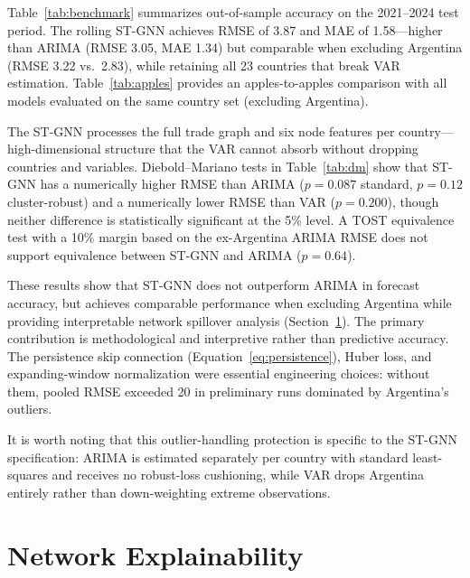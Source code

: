 \documentclass[12pt,a4paper]{article}
\begin{document}
Table~\ref{tab:benchmark} summarizes out-of-sample accuracy on the 2021--2024 test period.
The rolling ST-GNN achieves RMSE of 3.87 and MAE of 1.58---higher than ARIMA (RMSE 3.05, MAE 1.34) but comparable when excluding Argentina (RMSE 3.22 vs.\ 2.83), while retaining all 23 countries that break VAR estimation.
Table~\ref{tab:apples} provides an apples-to-apples comparison with all models evaluated on the same country set (excluding Argentina).





The ST-GNN processes the full trade graph and six node features per country---high-dimensional structure that the VAR cannot absorb without dropping countries and variables.
Diebold--Mariano tests in Table~\ref{tab:dm} show that ST-GNN has a numerically higher RMSE than ARIMA ($p=0.087$ standard, $p=0.12$ cluster-robust) and a numerically lower RMSE than VAR ($p=0.200$), though neither difference is statistically significant at the 5\% level.
A TOST equivalence test with a 10\% margin based on the ex-Argentina ARIMA RMSE does not support equivalence between ST-GNN and ARIMA ($p=0.64$).





These results show that ST-GNN does not outperform ARIMA in forecast accuracy, but achieves comparable performance when excluding Argentina while providing interpretable network spillover analysis (Section~\ref{sec:explain}).
The primary contribution is methodological and interpretive rather than predictive accuracy.
The persistence skip connection (Equation~\ref{eq:persistence}), Huber loss, and expanding-window normalization were essential engineering choices: without them, pooled RMSE exceeded 20 in preliminary runs dominated by Argentina's outliers.

It is worth noting that this outlier-handling protection is specific to the ST-GNN specification: ARIMA is estimated separately per country with standard least-squares and receives no robust-loss cushioning, while VAR drops Argentina entirely rather than down-weighting extreme observations.

\section{Network Explainability}
\label{sec:explain}
\end{document}
